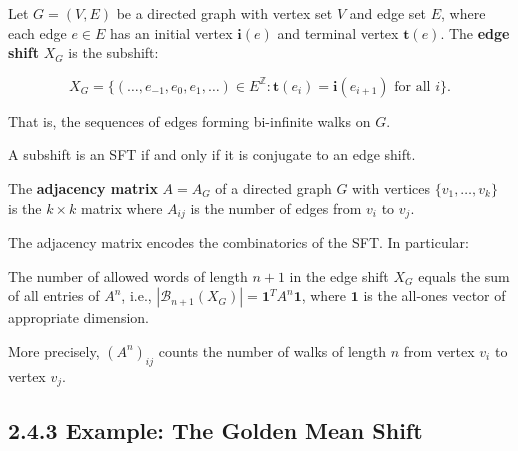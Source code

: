 \begin{definition}
Let $G = (V, E)$ be a directed graph with vertex set $V$ and edge set $E$, where each edge $e \in E$ has an initial vertex $\mathbf{i}(e)$ and terminal vertex $\mathbf{t}(e)$. The \textbf{edge shift} $X_G$ is the subshift:

\[X_G = \{ (\ldots, e_{-1}, e_0, e_1, \ldots) \in E^{\mathbb{Z}} : \mathbf{t}(e_i) = \mathbf{i}(e_{i+1}) \text{ for all } i \} .\]

That is, the sequences of edges forming bi-infinite walks on $G$.
\end{definition}

\begin{theorem}
A subshift is an SFT if and only if it is conjugate to an edge shift.
\end{theorem}

\begin{definition}
The \textbf{adjacency matrix} $A = A_G$ of a directed graph $G$ with vertices $\{ v_1, \ldots, v_k\} $ is the $k \times k$ matrix where $A_{ij}$ is the number of edges from $v_i$ to $v_j$.

The adjacency matrix encodes the combinatorics of the SFT. In particular:
\end{definition}

\begin{proposition}
The number of allowed words of length $n+1$ in the edge shift $X_G$ equals the sum of all entries of $A^n$, i.e., $|\mathcal{B}_{n+1}(X_G)| = \mathbf{1}^T A^n \mathbf{1}$, where $\mathbf{1}$ is the all-ones vector of appropriate dimension.

More precisely, $(A^n)_{ij}$ counts the number of walks of length $n$ from vertex $v_i$ to vertex $v_j$.
\end{proposition}

\subsection{2.4.3 Example: The Golden Mean Shift}

